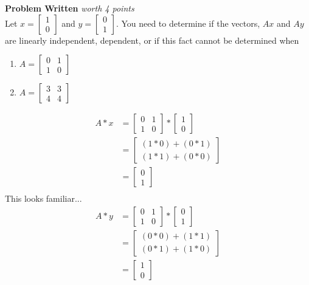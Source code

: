 \documentclass{article}
\newenvironment{problem}[3][Problem]
    { \begin{mdframed}[backgroundcolor=gray!20] \textbf{#1 #2} \textit{worth #3 points} \\}
    {  \end{mdframed}}
\begin{document}
\begin{problem}{Written}{4}
Let $x = \begin{bmatrix} 1 \\ 0\end{bmatrix}$ and $y = \begin{bmatrix} 0 \\ 1\end{bmatrix}$. You need to determine if the vectors, $Ax$ and $Ay$ are linearly independent, dependent, or if this fact cannot be determined when
\begin{enumerate}
    \item $A = \begin{bmatrix}
        0 &1 \\
        1 &0
    \end{bmatrix}$
    \item $A = \begin{bmatrix}
        3 &3 \\
        4 &4
    \end{bmatrix}$
\end{enumerate}
\end{problem}
\begin{align*}
    A*x &= \begin{bmatrix}
        0 &1 \\
        1 &0
    \end{bmatrix} * \begin{bmatrix}
        1\\ 0
    \end{bmatrix}\\
    &= \begin{bmatrix}
        (1*0) + (0*1)\\
        (1*1) + (0*0)
    \end{bmatrix}\\
    &= \begin{bmatrix}
        0 \\ 1
    \end{bmatrix}\\
\end{align*}
This looks familiar...
\begin{align*}
    A*y &= \begin{bmatrix}
        0 &1 \\
        1 &0
    \end{bmatrix} * \begin{bmatrix}
        0\\ 1
    \end{bmatrix}\\
    &= \begin{bmatrix}
        (0*0) + (1*1)\\
        (0*1) + (1*0)
    \end{bmatrix}\\
    &= \begin{bmatrix}
        1 \\ 0
    \end{bmatrix}\\
\end{align*}
\end{document}
